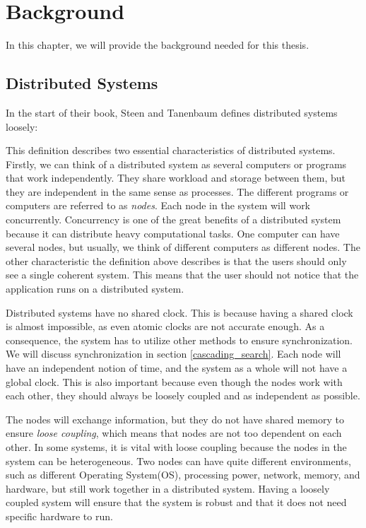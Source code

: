 \chapter{Background}

In this chapter, we will provide the background needed for this thesis.

\section{Distributed Systems}\label{background:distributed_systems}
In the start of their book, Steen and Tanenbaum\cite{steen_distributed_2017} defines distributed systems loosely: 

This definition describes two essential characteristics of distributed systems. Firstly, we can think of a distributed system as several computers or programs that work independently. They share workload and storage between them, but they are independent in the same sense as processes. The different programs or computers are referred to as \textit{nodes}. Each node in the system will work concurrently. Concurrency is one of the great benefits of a distributed system because it can distribute heavy computational tasks. One computer can have several nodes, but usually, we think of different computers as different nodes. The other characteristic the definition above describes is that the users should only see a single coherent system. This means that the user should not notice that the application runs on a distributed system.


Distributed systems have no shared clock. This is because having a shared clock is almost impossible, as even atomic clocks are not accurate enough. As a consequence, the system has to utilize other methods to ensure synchronization. We will discuss synchronization in section \ref{cascading_search}. Each node will have an independent notion of time, and the system as a whole will not have a global clock\cite{steen_distributed_2017}. This is also important because even though the nodes work with each other, they should always be loosely coupled and as independent as possible.


The nodes will exchange information, but they do not have shared memory to ensure \textit{loose coupling}, which means that nodes are not too dependent on each other. In some systems, it is vital with loose coupling because the nodes in the system can be heterogeneous. Two nodes can have quite different environments, such as different Operating System(OS), processing power, network, memory, and hardware, but still work together in a distributed system. Having a loosely coupled system will ensure that the system is robust and that it does not need specific hardware to run.

